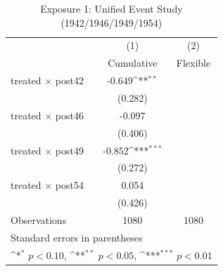 \begin{table}[htbp]\centering
\def\sym#1{\ifmmode^{#1}\else\(^{#1}\)\fi}
\caption{Exposure 1: Unified Event Study (1942/1946/1949/1954)}
\begin{tabular}{l*{2}{c}}
\hline\hline
                    &\multicolumn{1}{c}{(1)}&\multicolumn{1}{c}{(2)}\\
                    &\multicolumn{1}{c}{Cumulative}&\multicolumn{1}{c}{Flexible}\\
\hline
treated $\times$ post42&      -0.649\sym{**} &                     \\
                    &     (0.282)         &                     \\
[1em]
treated $\times$ post46&      -0.097         &                     \\
                    &     (0.406)         &                     \\
[1em]
treated $\times$ post49&      -0.852\sym{***}&                     \\
                    &     (0.272)         &                     \\
[1em]
treated $\times$ post54&       0.054         &                     \\
                    &     (0.426)         &                     \\
\hline
Observations        &        1080         &        1080         \\
\hline\hline
\multicolumn{3}{l}{\footnotesize Standard errors in parentheses}\\
\multicolumn{3}{l}{\footnotesize \sym{*} \(p<0.10\), \sym{**} \(p<0.05\), \sym{***} \(p<0.01\)}\\
\end{tabular}
\end{table}
